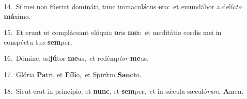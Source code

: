 {\numbfont\textcolor{\numbcolor}{14.}}~Si mei non fúerint domináti, tunc immacu\-\textbf{lá}\-tus \textbf{e}\-ro:~\star et emundábor a delíc\textit{to} \textbf{má}\-ximo.\par
{\numbfont\textcolor{\numbcolor}{15.}}~Et erunt ut compláceant elóquia \textbf{o}\-ris \textbf{me}\-i:~\star et meditátio cordis mei in conspéctu tu\textit{o} \textbf{sem}\-per.\par
{\numbfont\textcolor{\numbcolor}{16.}}~Dómine, ad\-\textbf{jú}\-tor \textbf{me}\-us,~\star et redémp\textit{tor} \textbf{me}\-us.\par
{\numbfont\textcolor{\numbcolor}{17.}}~Glória \textbf{Pa}\-tri, et \textbf{Fí}\-\textbf{li}o,~\star et Spirítu\textit{i} \textbf{Sanc}\-to.\par
{\numbfont\textcolor{\numbcolor}{18.}}~Sicut erat in princípio, et \textbf{nunc}\-, et \textbf{sem}\-per,~\star et in sǽcula sæculó\-\textit{rum}\-. \textbf{A}\-men.\par
